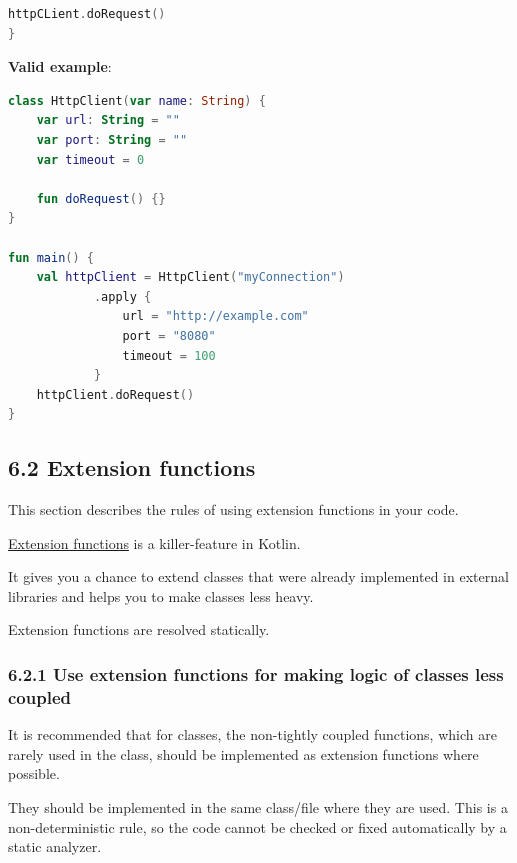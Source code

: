 {{{{{{{{{{{{{{{{{{{{\begin{lstlisting}[language=Kotlin]
    httpCLient.doRequest()
}   

\end{lstlisting}


\textbf{Valid example}:

\begin{lstlisting}[language=Kotlin]
class HttpClient(var name: String) {
    var url: String = ""
    var port: String = ""
    var timeout = 0

    fun doRequest() {}
}

fun main() {
    val httpClient = HttpClient("myConnection")
            .apply {
                url = "http://example.com"
                port = "8080"
                timeout = 100
            }
    httpClient.doRequest()
}
\end{lstlisting}


\subsection*{\textbf{6.2 Extension functions}}

\label{sec:6.2}

This section describes the rules of using extension functions in your code.



\href{https://kotlinlang.org/docs/reference/extensions.html}{Extension functions} is a killer-feature in Kotlin. 

It gives you a chance to extend classes that were already implemented in external libraries and helps you to make classes less heavy.

Extension functions are resolved statically.



\subsubsection*{\textbf{6.2.1 Use extension functions for making logic of classes less coupled}}
\leavevmode\newline

\label{sec:6.2.1}

It is recommended that for classes, the non-tightly coupled functions, which are rarely used in the class, should be implemented as extension functions where possible.

They should be implemented in the same class/file where they are used. This is a non-deterministic rule, so the code cannot be checked or fixed automatically by a static analyzer.



}}}}}}}}}}}}}}}}}}}}
